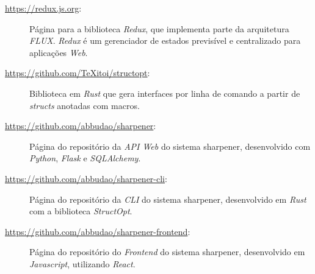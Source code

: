 \begin{description}
  \label{link:redux}
\item[\url{https://redux.js.org}:] Página para a biblioteca \emph{Redux}, que implementa 
  parte da arquitetura \emph{FLUX}. \emph{Redux} é um gerenciador de estados previsível 
  e centralizado para aplicações \emph{Web}.

  \label{link:struct_opt}
\item[\url{https://github.com/TeXitoi/structopt}:] Biblioteca em \emph{Rust} que gera 
  interfaces por linha de comando a partir de \emph{structs} anotadas com macros. 
  
  \label{link:api}
\item[\url{https://github.com/abbudao/sharpener}:] Página do repositório da \emph{API Web} do sistema sharpener, 
desenvolvido com \emph{Python}, \emph{Flask} e \emph{SQLAlchemy}.

  \label{link:cli}
\item[\url{https://github.com/abbudao/sharpener-cli}:] Página do repositório da \emph{CLI} do sistema sharpener, 
desenvolvido em \emph{Rust} com a biblioteca \emph{StructOpt}.

  \label{link:frontend}
\item[\url{https://github.com/abbudao/sharpener-frontend}:] Página do repositório do \emph{Frontend} do sistema sharpener, 
desenvolvido em \emph{Javascript}, utilizando \emph{React}.
\end{description}
